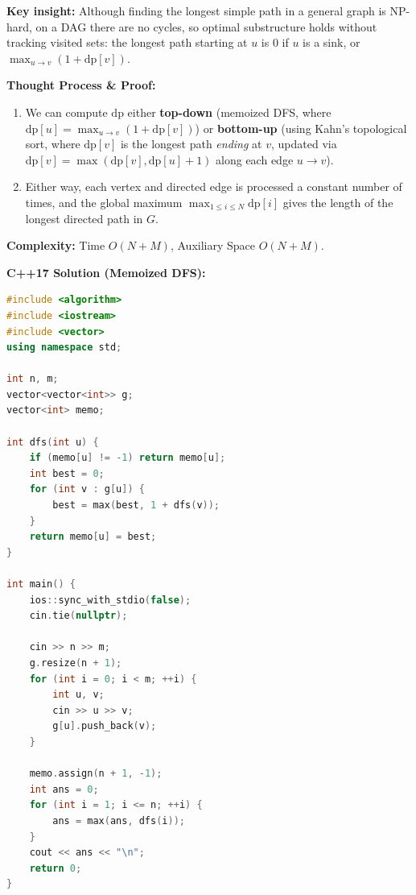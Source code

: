 \documentclass[11pt]{article}
\newcommand{\insight}[1]{\par\medskip\noindent\textbf{Key insight:} #1\par\smallskip}
\begin{document}
\insight{Although finding the longest simple path in a general graph is NP-hard, on a DAG there are no cycles, so optimal substructure holds without tracking visited sets: the longest path starting at $u$ is $0$ if $u$ is a sink, or $\max_{u \to v} (1 + \text{dp}[v])$.}

\textbf{Thought Process \& Proof:}
\begin{enumerate}
    \item We can compute $\text{dp}$ either \textbf{top-down} (memoized DFS, where $\text{dp}[u] = \max_{u \to v}(1 + \text{dp}[v])$) or \textbf{bottom-up} (using Kahn's topological sort, where $\text{dp}[v]$ is the longest path \emph{ending} at $v$, updated via $\text{dp}[v] = \max(\text{dp}[v], \text{dp}[u] + 1)$ along each edge $u \to v$).
    \item Either way, each vertex and directed edge is processed a constant number of times, and the global maximum $\max_{1 \le i \le N} \text{dp}[i]$ gives the length of the longest directed path in $G$.
\end{enumerate}

\textbf{Complexity:} Time $O(N + M)$, Auxiliary Space $O(N + M)$.

\textbf{C++17 Solution (Memoized DFS):}
\begin{lstlisting}[language=C++]
#include <algorithm>
#include <iostream>
#include <vector>
using namespace std;

int n, m;
vector<vector<int>> g;
vector<int> memo;

int dfs(int u) {
    if (memo[u] != -1) return memo[u];
    int best = 0;
    for (int v : g[u]) {
        best = max(best, 1 + dfs(v));
    }
    return memo[u] = best;
}

int main() {
    ios::sync_with_stdio(false);
    cin.tie(nullptr);

    cin >> n >> m;
    g.resize(n + 1);
    for (int i = 0; i < m; ++i) {
        int u, v;
        cin >> u >> v;
        g[u].push_back(v);
    }

    memo.assign(n + 1, -1);
    int ans = 0;
    for (int i = 1; i <= n; ++i) {
        ans = max(ans, dfs(i));
    }
    cout << ans << "\n";
    return 0;
}
\end{lstlisting}
\end{document}
